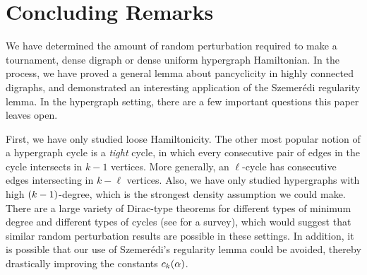 \documentclass[11pt,english]{article}
\theoremstyle{plain}
\theoremstyle{definition}
\theoremstyle{definition}
\theoremstyle{plain}
\theoremstyle{plain}
\theoremstyle{plain}
\theoremstyle{plain}
\theoremstyle{remark}
\theoremstyle{remark}
\let\originalleft\left
\let\originalright\right
\renewcommand{\left}{\mathopen{}\mathclose\bgroup\originalleft}
\renewcommand{\right}{\aftergroup\egroup\originalright}
\begin{document}
\section{Concluding Remarks}

We have determined the amount of random perturbation required to make
a tournament, dense digraph or dense uniform hypergraph Hamiltonian. In
the process, we have proved a general lemma about pancyclicity in
highly connected digraphs, and demonstrated an interesting application
of the Szemer\'edi regularity lemma. In the hypergraph setting, there are a few important questions
this paper leaves open.

First, we have only studied loose Hamiltonicity. The other most popular
notion of a hypergraph cycle is a \emph{tight} cycle, in which every
consecutive pair of edges in the cycle intersects in $k-1$ vertices.
More generally, an $\ell$-cycle has consecutive edges intersecting
in $k-\ell$ vertices. Also, we have only studied hypergraphs with
high $\left(k-1\right)$-degree, which is the strongest density assumption
we could make. There are a large variety of Dirac-type theorems for
different types of minimum degree and different types of cycles (see
\cite{RR10} for a survey), which would suggest that similar random
perturbation results are possible in these settings. In addition,
it is possible that our use of Szemer\'edi's regularity lemma could
be avoided, thereby drastically improving the constants $\chyp\left(\alpha\right)$.
\end{document}
